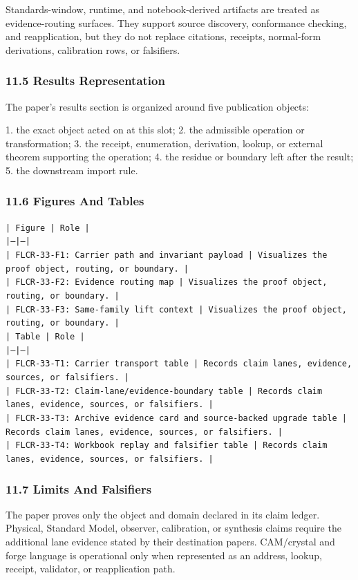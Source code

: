 \documentclass[11pt]{article}
\begin{document}
Standards-window, runtime, and notebook-derived artifacts are treated
as evidence-routing surfaces. They support source discovery, conformance
checking, and reapplication, but they do not replace citations, receipts,
normal-form derivations, calibration rows, or falsifiers.

\subsubsection*{11.5 Results Representation}

The paper's results section is organized around five publication objects:

1. the exact object acted on at this slot;
2. the admissible operation or transformation;
3. the receipt, enumeration, derivation, lookup, or external theorem supporting
   the operation;
4. the residue or boundary left after the result;
5. the downstream import rule.

\subsubsection*{11.6 Figures And Tables}

\noindent\texttt{| Figure | Role |}\\
\noindent\texttt{|---|---|}\\
\noindent\texttt{| FLCR-33-F1: Carrier path and invariant payload | Visualizes the proof object, routing, or boundary. |}\\
\noindent\texttt{| FLCR-33-F2: Evidence routing map | Visualizes the proof object, routing, or boundary. |}\\
\noindent\texttt{| FLCR-33-F3: Same-family lift context | Visualizes the proof object, routing, or boundary. |}\\

\noindent\texttt{| Table | Role |}\\
\noindent\texttt{|---|---|}\\
\noindent\texttt{| FLCR-33-T1: Carrier transport table | Records claim lanes, evidence, sources, or falsifiers. |}\\
\noindent\texttt{| FLCR-33-T2: Claim-lane/evidence-boundary table | Records claim lanes, evidence, sources, or falsifiers. |}\\
\noindent\texttt{| FLCR-33-T3: Archive evidence card and source-backed upgrade table | Records claim lanes, evidence, sources, or falsifiers. |}\\
\noindent\texttt{| FLCR-33-T4: Workbook replay and falsifier table | Records claim lanes, evidence, sources, or falsifiers. |}\\

\subsubsection*{11.7 Limits And Falsifiers}

The paper proves only the object and domain declared in its claim ledger.
Physical, Standard Model, observer, calibration, or synthesis claims require
the additional lane evidence stated by their destination papers. CAM/crystal
and forge language is operational only when represented as an address, lookup,
receipt, validator, or reapplication path.
\end{document}
